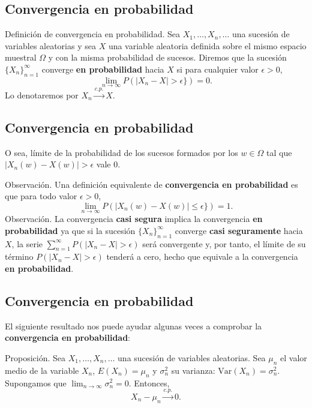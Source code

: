 \documentclass[]{book}
\begin{document}
\hypertarget{convergencia-en-probabilidad}{%
\subsection{Convergencia en probabilidad}\label{convergencia-en-probabilidad}}

 Definición de convergencia en probabilidad.
Sea \(X_1,\ldots,X_n,\ldots\) una sucesión de variables aleatorias y sea \(X\) una variable aleatoria definida sobre el mismo espacio muestral \(\Omega\) y con la misma probabilidad de sucesos. Diremos que la sucesión \(\{X_n\}_{n=1}^\infty\) converge \textbf{en probabilidad} hacia \(X\) si para cualquier valor \(\epsilon >0\),
\[
\lim_{n\to\infty} P(|X_n-X|>\epsilon \})=0.
\]
Lo denotaremos por \(X_n\stackrel{c.p.}{\longrightarrow}X\).

\hypertarget{convergencia-en-probabilidad-1}{%
\subsection{Convergencia en probabilidad}\label{convergencia-en-probabilidad-1}}

O sea, límite de la probabilidad de los sucesos formados por los \(w\in\Omega\) tal que \(|X_n(w)-X(w)|>\epsilon\) vale 0.

Observación.
Una definición equivalente de \textbf{convergencia en probabilidad} es que para todo valor \(\epsilon >0\),
\[
\lim_{n\to\infty} P(|X_n(w)-X(w)|\leq \epsilon \})=1.
\]
Observación.
La convergencia \textbf{casi segura} implica la convergencia \textbf{en probabilidad} ya que si la sucesión \(\{X_n\}_{n=1}^\infty\) converge \textbf{casi seguramente} hacia \(X\), la serie \(\sum_{n=1}^\infty P(|X_n-X|>\epsilon)\) será convergente y, por tanto, el límite de su término \(P(|X_n-X|>\epsilon)\) tenderá a cero, hecho que equivale a la convergencia \textbf{en probabilidad}.

\hypertarget{convergencia-en-probabilidad-2}{%
\subsection{Convergencia en probabilidad}\label{convergencia-en-probabilidad-2}}

El siguiente resultado nos puede ayudar algunas veces a comprobar la \textbf{convergencia en probabilidad}:

Proposición.
Sea \(X_1,\ldots,X_n,\ldots\) una sucesión de variables aleatorias. Sea \(\mu_n\) el valor medio de la variable \(X_n\), \(E(X_n)=\mu_n\) y \(\sigma_n^2\) su varianza: \(\mathrm{Var}(X_n)=\sigma_n^2\). Supongamos que \(\lim_{n\to\infty}\sigma_n^2=0\). Entonces,
\[
X_n-\mu_n\stackrel{c.p.}{\longrightarrow} 0.
\]
\end{document}
